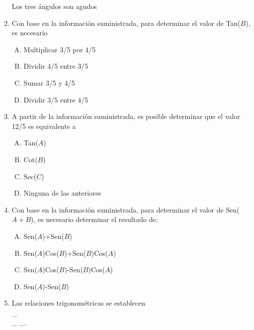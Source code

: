 \begin{enumerate}
Los tres ángulos son agudos

\item  Con base en la información suministrada, para determinar el valor de Tan($B$), es necesario\label{yolma-14}\\

\begin{enumerate}[(A)]
\item  Multiplicar 3/5 por 4/5
\item Dividir 4/5 entre 3/5
\item Sumar 3/5 y 4/5
\item Dividir 3/5 entre 4/5
\end{enumerate}


\item A partir de la información suministrada, es posible determinar que el valor 12/5 es equivalente a  \label{yolma-15}\\

\begin{enumerate}[(A)]
\item  Tan($A$)
\item Cot($B$)
\item Sec($C$)
\item Ninguna de las anteriores
\end{enumerate}


\item  Con base en la información suministrada, para determinar el valor de Sen($A+B$), es necesario determinar el resultado de: \label{yolma-16}\\

\begin{enumerate}[(A)]
\item  Sen($A$)+Sen($B$)
\item Sen($A$)Cos($B$)+Sen($B$)Cos($A$)
\item Sen($A$)Cos($B$)-Sen($B$)Cos($A$)
\item Sen($A$)-Sen($B$)
\end{enumerate}


\item  Las relaciones trigonométricas se establecen\label{yolma-17}\hrulefill\\
\_\hrulefill\\
\_\hrulefill
\_\hrulefill.




\end{enumerate}
